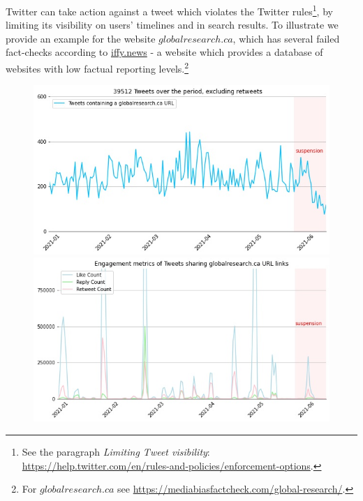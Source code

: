 \documentclass[11pt,a4paper]{article}
\begin{document}
Twitter can take action against a tweet which violates the Twitter rules\footnote{See the paragraph {\it Limiting Tweet visibility}: \href{https://help.twitter.com/en/rules-and-policies/enforcement-options}{https://help.twitter.com/en/rules-and-policies/enforcement-options}.}, by limiting its visibility on users' timelines and in search results. To illustrate we provide an example for the website $globalresearch.ca$, which has several failed fact-checks according to \href{https://iffy.news}{iffy.news} - a website which provides a database of websites with low factual reporting levels.\footnote{For $globalresearch.ca$ see \href{https://mediabiasfactcheck.com/global-research/}{https://mediabiasfactcheck.com/global-research/}.}

\smallskip

\begin{figure}
\centering
	\begin{multicols}{1}
		\includegraphics[scale=0.35]{./img/globalresearch/sum_globalresearch.ca_6_months.jpg} 
		\includegraphics[scale=0.35]{./img/globalresearch/engagement_sum_rolling_1_globalresearch.ca.jpg}
	\end{multicols}
\caption{}
\label{fig4}
\end{figure}
\end{document}
